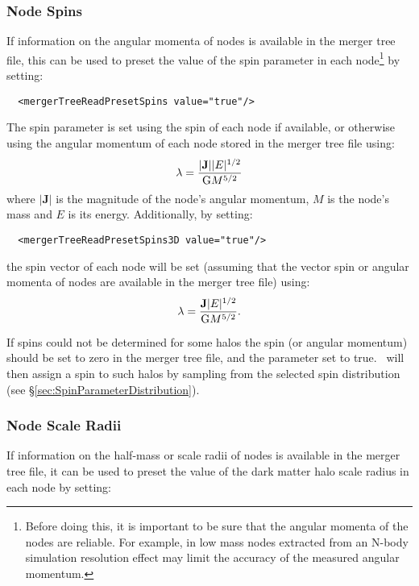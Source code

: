 \subsubsection{Node Spins}

If information on the angular momenta of nodes is available in the merger tree file, this can be used to preset the value of the spin parameter in each node\footnote{Before doing this, it is important to be sure that the angular momenta of the nodes are reliable. For example, in low mass nodes extracted from an N-body simulation resolution effect may limit the accuracy of the measured angular momentum.} by setting:

\begin{verbatim}
  <mergerTreeReadPresetSpins value="true"/>
\end{verbatim}

The spin parameter is set using the spin of each node if available, or otherwise using the angular momentum of each node stored in the merger tree file using:
\begin{equation}
 \lambda = {|{\mathbf J}| |E|^{1/2} \over {\mathrm G} M^{5/2}}
\end{equation}
where $|{\mathbf J}|$ is the magnitude of the node's angular momentum, $M$ is the node's mass and $E$ is its energy. Additionally, by setting:

\begin{verbatim}
  <mergerTreeReadPresetSpins3D value="true"/>
\end{verbatim}
the spin vector of each node will be set (assuming that the vector spin or angular momenta of nodes are available in the merger tree file) using:
\begin{equation}
 {\mathbf \lambda} = {{\mathbf J} |E|^{1/2} \over {\mathrm G} M^{5/2}}.
\end{equation}

If spins could not be determined for some halos the spin (or angular momentum) should be set to zero in the merger tree file, and the parameter {\normalfont \ttfamily [mergerTreeReadPresetUnphysicalSpins]} set to {\normalfont \ttfamily true}. \glc\ will then assign a spin to such halos by sampling from the selected spin distribution (see \S\ref{sec:SpinParameterDistribution}). 

\subsubsection{Node Scale Radii}

If information on the half-mass or scale radii of nodes is available in the merger tree file, it can be used to preset the value of the dark matter halo scale radius in each node by setting:

